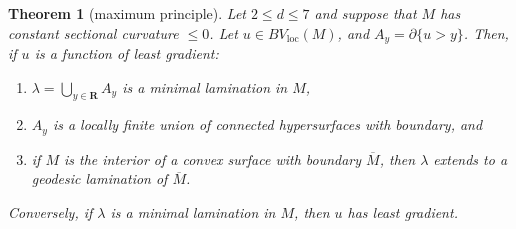 \documentclass[reqno,12pt,letterpaper]{amsart}
\newcommand{\RR}{\mathbf{R}}
\newcommand{\loc}{\mathrm{loc}}
\newtheorem{theorem}{Theorem}[section]
\theoremstyle{definition}
\numberwithin{equation}{section}
\begin{document}
\begin{theorem}[maximum principle]\label{main thm}
Let $2 \leq d \leq 7$ and suppose that $M$ has constant sectional curvature $\leq 0$.
Let $u \in BV_\loc(M)$, and $A_y = \partial \{u > y\}$.
Then, if $u$ is a function of least gradient:
\begin{enumerate}
\item $\lambda = \bigcup_{y \in \RR} A_y$ is a minimal lamination in $M$,
\item $A_y$ is a locally finite union of connected hypersurfaces with boundary, and 
\item if $M$ is the interior of a convex surface with boundary $\overline M$, then $\lambda$ extends to a geodesic lamination of $\overline M$.
\end{enumerate}
Conversely, if $\lambda$ is a minimal lamination in $M$, then $u$ has least gradient.
\end{theorem}
\end{document}
